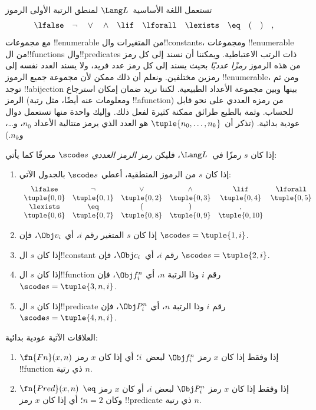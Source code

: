 \documentclass[../../../include/open-logic-section]{subfiles}
\begin{document}

تستعمل اللغة الأساسية~$\Lang L$ لمنطق الرتبة الأولى الرموز
\[
\lfalse \quad \lnot \quad \lor \quad \land \quad \lif \quad \lforall
\quad \lexists \quad \eq \quad ( \quad ) \quad ,
\]
مع مجموعات !!{enumerable} من المتغيرات وال!!{constant}s، ومجموعات
!!{enumerable} من ال!!{function}s وال!!{predicate}s ذات الرتب
الاعتباطية. ويمكننا أن نسند إلى كل رمز من هذه الرموز \emph{رمزًا
عدديًا} بحيث يسند إلى كل رمز عدد فريد، ولا يسند العدد نفسه إلى رمزين
مختلفين. ونعلم أن ذلك ممكن لأن مجموعة جميع الرموز !!{enumerable}، ومن
ثم توجد !!a{bijection} بينها وبين مجموعة الأعداد الطبيعية. لكننا نريد
ضمان إمكان استرجاع الرمز (ومعلومات عنه أيضًا، مثل رتبة
!!a{function}) من رمزه العددي على نحو قابل للحساب. وثمة بالطبع طرائق
ممكنة كثيرة لفعل ذلك. وإليك واحدة منها تستعمل دوال عودية بدائية.
(تذكر أن $\tuple{n_0,\dots,n_k}$ هو العدد الذي يرمز متتالية الأعداد
$n_0$، و\dots، و$n_k$.)

\begin{defn}
إذا كان $s$ رمزًا في~$\Lang L$، فليكن \emph{رمز الرمز العددي}
$\scode s$ معرفًا كما يأتي:
\begin{enumerate}
\item إذا كان $s$ من الرموز المنطقية، أعطي $\scode s$ بالجدول الآتي:
\[
\begin{array}{cccccccccc}
  \lfalse & \lnot & \lor & \land & \lif & \lforall \\
\tuple{0, 0} & \tuple{0, 1} & \tuple{0, 2} & \tuple{0, 3} &
\tuple{0, 4} & \tuple{0, 5} \\
\lexists & \eq & ( & ) & ,\\
\tuple{0, 6} & \tuple{0, 7} &
\tuple{0, 8} & \tuple{0, 9} & \tuple{0, 10}
\end{array}
\]
\item إذا كان $s$ المتغير رقم $i$، أي $\Obj v_i$، فإن
$\scode s=\tuple{1,i}$.
\item إذا كان $s$ ال!!{constant} رقم $i$، أي~$\Obj c_i$، فإن
  $\scode s=\tuple{2,i}$.
\item إذا كان $s$ ال!!{function} رقم $i$ وذا الرتبة $n$، أي
$\Obj f_i^n$، فإن $\scode s=\tuple{3,n,i}$.
\item إذا كان $s$ ال!!{predicate} رقم $i$ وذا الرتبة $n$، أي
$\Obj P_i^n$، فإن $\scode s=\tuple{4,n,i}$.
\end{enumerate}
\end{defn}

\begin{prop}
العلاقات الآتية عودية بدائية:
\begin{enumerate}
\item $\fn{Fn}(x,n)$ إذا وفقط إذا كان $x$ رمز $\Obj f^n_i$ لبعض~$i$؛
  أي إذا كان $x$ رمز !!{function} ذي رتبة $n$.
\item $\fn{Pred}(x,n)$ إذا وفقط إذا كان $x$ رمز $\Obj P^n_i$ لبعض
  $i$، أو كان $x$ رمز $\eq$ وكان $n=2$؛ أي إذا كان $x$ رمز
  !!{predicate} ذي رتبة $n$.
\end{enumerate}
\end{prop}
\end{document}
